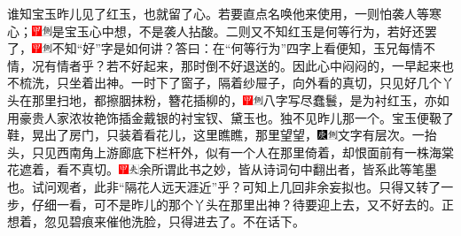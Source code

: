 谁知宝玉昨儿见了红玉，也就留了心。若要直点名唤他来使用，一则怕袭人等寒心；{\includegraphics[width=3mm]{../Images/00002}\includegraphics[width=3mm]{../Images/00011}\footnotesize \kaishu 是宝玉心中想，不是袭人拈酸。}二则又不知红玉是何等行为，若好还罢了，{\includegraphics[width=3mm]{../Images/00002}\includegraphics[width=3mm]{../Images/00011}\footnotesize \kaishu 不知``好''字是如何讲？答曰：在``何等行为''四字上看便知，玉兄每情不情，况有情者乎？}若不好起来，那时倒不好退送的。因此心中闷闷的，一早起来也不梳洗，只坐着出神。一时下了窗子，隔着纱屉子，向外看的真切，只见好几个丫头在那里扫地，都擦胭抹粉，簪花插柳的，{\includegraphics[width=3mm]{../Images/00002}\includegraphics[width=3mm]{../Images/00011}\footnotesize \kaishu 八字写尽蠢鬟，是为衬红玉，亦如用豪贵人家浓妆艳饰插金戴银的衬宝钗、黛玉也。}独不见昨儿那一个。宝玉便靸了鞋，晃出了房门，只装着看花儿，这里瞧瞧，那里望望，{\includegraphics[width=3mm]{../Images/00004}\includegraphics[width=3mm]{../Images/00011}\footnotesize \kaishu 文字有层次。}一抬头，只见西南角上游廊底下栏杆外，似有一个人在那里倚着，却恨面前有一株海棠花遮着，看不真切。{\includegraphics[width=3mm]{../Images/00002}\includegraphics[width=3mm]{../Images/00012}\footnotesize \kaishu 余所谓此书之妙，皆从诗词句中翻出者，皆系此等笔墨也。试问观者，此非``隔花人远天涯近''乎？可知上几回非余妄拟也。}只得又转了一步，仔细一看，可不是昨儿的那个丫头在那里出神？待要迎上去，又不好去的。正想着，忽见碧痕来催他洗脸，只得进去了。不在话下。

